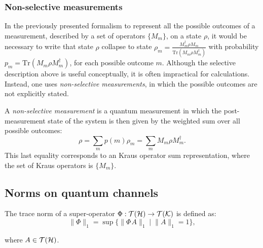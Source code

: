 \subsubsection{Non-selective measurements}

In the previously presented formalism to represent all the possible outcomes of a measurement, described by a set of operators $\{M_{m}\}$, on a state $\rho$, it would be necessary to write that state $\rho$ collapse to state $\rho_m=\frac{M_{m}^{\dag}\rho M_{m}}{\text{Tr}(M_{m}\rho M_{m}^{\dag})}$ with probability $p_m=\text{Tr}(M_{m}\rho M_{m}^{\dag})$, for each possible outcome $m$. Although the selective description above is useful conceptually, it is often impractical for calculations. Instead, one uses \emph{non-selective measurements}, in which the possible outcomes are not explicitly stated.


\begin{definition}
A \emph{non-selective measurement} is a quantum measurement in which the post-measurement state of the system is then given by the weighted sum over all possible outcomes:
\[
\rho = \sum_m p(m) \rho_m = \sum_m M_m \rho M_m^{\dag}.
\]
This last equality corresponds to an Kraus operator sum representation, where the set of Kraus operators is $\{M_{m}\}$.
\end{definition}

\subsection{Norms on quantum channels}
\begin{definition} \label{def:trace_norm_superoperator}
  The trace norm of a super-operator $\Phi: \mathcal{T}(\mathcal{H}) \rightarrow \mathcal{T}(\mathcal{K})$ is defined as:
  \begin{equation*} 
    \lVert \Phi \rVert_{1} =  \sup\{\lVert \Phi \hspace{1pt} A \rVert_{1}   \mid  \lVert A \rVert_{1}=1\}, 
  \end{equation*}
\end{definition}
where $A \in \mathcal{T}(\mathcal{H})$.


